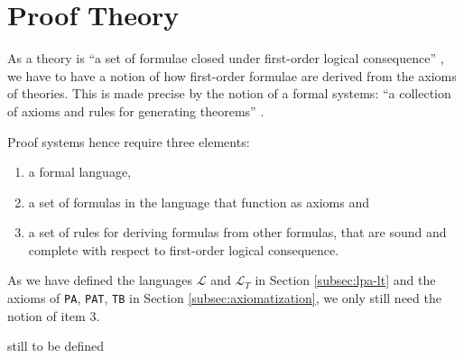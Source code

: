 \section{Proof Theory}\label{subsec:proof-theory}
As a theory is ``a set of formulae closed under first-order logical consequence'' \cite[p. 29]{halbach:2011}, we have to have a notion of how first-order formulae are derived from the axioms of theories. This is made precise by the notion of a formal systems: ``a collection of axioms and rules for generating theorems'' \cite[p. 29]{halbach:2011}.

Proof systems hence require three elements:
\begin{enumerate}
\item a formal language,
\item a set of formulas in the language that function as axioms and
\item a set of rules for deriving formulas from other formulas, that are sound and complete with respect to first-order logical consequence.
\end{enumerate}

As we have defined the languages $\mathcal{L}$ and $\mathcal{L}_T$ in Section \ref{subsec:lpa-lt} and the axioms of \texttt{PA}, \texttt{PAT}, \texttt{TB} in Section \ref{subsec:axiomatization}, we only still need the notion of item 3.

\begin{definition}
  still to be defined
\end{definition}

